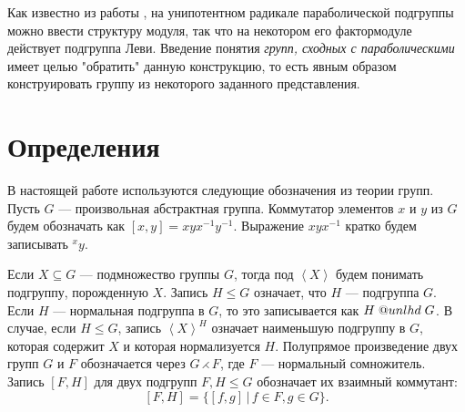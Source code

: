 \documentclass[12pt]{matmex-diploma}
\makeatletter
\newcommand{\slunlhd}{%
  \mathrel{\mathpalette\sl@unlhd\relax}%
}
\newcommand{\sl@unlhd}[2]{%
  \sbox\z@{$#1\lhd$}%
  \sbox\tw@{$#1\leqslant$}%
  \dimen@=\ht\tw@
  \advance\dimen@-\ht\z@
  \ifx#1\displaystyle
    \advance\dimen@ .2pt
  \else
    \ifx#1\textstyle
      \advance\dimen@ .2pt
    \fi
  \fi
  \ooalign{\raisebox{\dimen@}{$\m@th#1\lhd$}\cr$\m@th#1\leqslant$\cr}%
}
\theoremstyle{mystyleni}
\theoremstyle{mystyle}
\newtheorem{definition}{Определение}
\renewcommand{\le}{\leqslant}
\renewcommand{\trianglelefteq}{\slunlhd}
\makeatother
\begin{document}
Как известно из работы \citep{Azad1990}, на унипотентном радикале параболической подгруппы можно ввести структуру модуля, так что на некотором его фактормодуле действует подгруппа Леви. Введение понятия \emph{групп, сходных с параболическими} имеет целью "обратить" данную конструкцию, то есть явным образом конструировать группу из некоторого заданного представления.

\section{Определения}

\begin{comment}
Следующие три определения широко известны и приведены, например, в работах \cite{Conrad11reductivegroup}, \#, \#.
\begin{definition} 
Редуктивной $R$-группой называется линейная алгебраическая $R$-группа, не содержащая нетривиальных связных нормальных унипотентных линейных алгебраических $R$-подгрупп.
\end{definition}

\begin{definition}
Полупростой $R$-группой называется линейная алгебраическая $R$-группа, не содержащая нетривиальных связных нормальных разрешимых линейных алгебраических $R$-подгрупп.
\end{definition}

\begin{definition}
Простой $R$-группой называется линейная алгебраическая $R$-группа, не содержащая нетривиальных связных нормальных линейных алгебраических $R$-подгрупп.
\end{definition}
\end{comment}

В настоящей работе используются следующие обозначения из теории групп.\linebreak
Пусть $G$ --- произвольная абстрактная группа. Коммутатор элементов $x$ и $y$ из $G$ будем обозначать как $[x,y]=x y x^{-1} y^{-1}$.
Выражение $x y x^{-1}$ кратко будем записывать ${}^x y$.

Если $X \subseteq G$ --- подмножество группы $G$, тогда под $\left<X\right>$ будем понимать подгруппу, порожденную $X$.
Запись $H\le G$ означает, что $H$ --- подгруппа $G$.
Если $H$ --- нормальная подгруппа в $G$, то это записывается как $H \trianglelefteq G$. В случае, если $H \le G$, запись $\left<X\right>^H$ означает наименьшую подгруппу в $G$, которая содержит $X$ и которая нормализуется $H$.
Полупрямое произведение двух групп $G$ и $F$ обозначается через $G\rightthreetimes F$, где $F$ --- нормальный сомножитель.
Запись $[F,H]$ для двух подгрупп $F,H \le G$ обозначает их взаимный коммутант:
$$ [F,H] = \{[f,g] \, | \, f\in F, g \in G  \} .$$
\end{document}
